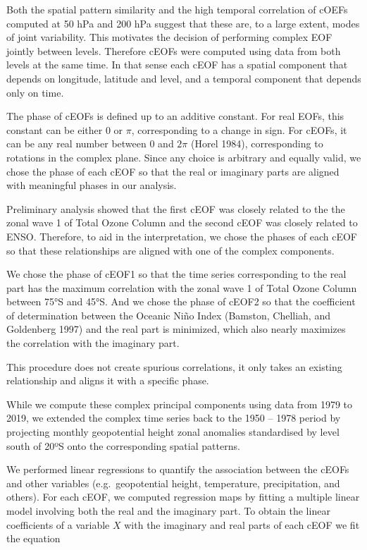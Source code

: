 \documentclass[smallextended]{svjour3}       %
\begin{document}
Both the spatial pattern similarity and the high temporal correlation of cOEFs computed at 50 hPa and 200 hPa suggest that these are, to a large extent, modes of joint variability.
This motivates the decision of performing complex EOF jointly between levels.
Therefore cEOFs were computed using data from both levels at the same time.
In that sense each cEOF has a spatial component that depends on longitude, latitude and level, and a temporal component that depends only on time.

The phase of cEOFs is defined up to an additive constant.
For real EOFs, this constant can be either 0 or \(\pi\), corresponding to a change in sign.
For cEOFs, it can be any real number between 0 and \(2\pi\) (Horel 1984), corresponding to rotations in the complex plane.
Since any choice is arbitrary and equally valid, we chose the phase of each cEOF so that the real or imaginary parts are aligned with meaningful phases in our analysis.

Preliminary analysis showed that the first cEOF was closely related to the the zonal wave 1 of Total Ozone Column and the second cEOF was closely related to ENSO.
Therefore, to aid in the interpretation, we chose the phases of each cEOF so that these relationships are aligned with one of the complex components.

We chose the phase of cEOF1 so that the time series corresponding to the real part has the maximum correlation with the zonal wave 1 of Total Ozone Column between 75°S and 45°S.
And we chose the phase of cEOF2 so that the coefficient of determination between the Oceanic Niño Index (Bamston, Chelliah, and Goldenberg 1997) and the real part is minimized, which also nearly maximizes the correlation with the imaginary part.

This procedure does not create spurious correlations, it only takes an existing relationship and aligns it with a specific phase.



While we compute these complex principal components using data from 1979 to 2019, we extended the complex time series back to the 1950 -- 1978 period by projecting monthly geopotential height zonal anomalies standardised by level south of 20ºS onto the corresponding spatial patterns.

We performed linear regressions to quantify the association between the cEOFs and other variables (e.g.~geopotential height, temperature, precipitation, and others).
For each cEOF, we computed regression maps by fitting a multiple linear model involving both the real and the imaginary part.
To obtain the linear coefficients of a variable \(X\) with the imaginary and real parts of each cEOF we fit the equation
\end{document}
